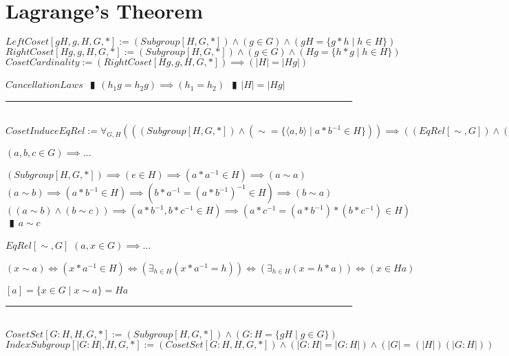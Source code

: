 \documentclass{book}
\newcommand{\abr}{:=}
\newcommand{\pipe}{$\phantom{(}\vrectangleblack\phantom{)}$}
\newcommand{\st}{\mathbin{|}}
\begin{document}
\section{Lagrange's Theorem}
$LeftCoset[g H, g, H, G, *] \abr (Subgroup[H, G, *]) \land (g \in G) \land (g H = \{g * h \st h \in H\})$ \\
$RightCoset[H g, g, H, G, *] \abr (Subgroup[H, G, *]) \land (g \in G) \land (H g = \{h * g \st h \in H\})$ \\

$CosetCardinality \abr (RightCoset[H g, g, H, G, *]) \implies (|H| = |H g|)$
\begin{enumerate}
  \lit $CancellationLaws$ \pipe $(h_1 g = h_2 g) \implies (h_1 = h_2)$ \pipe $|H| = |H g|$
\end{enumerate} \vspace{.75mm} \hrule \vspace{.75mm} \ \\ 

$CosetInduceEqRel \abr \forall_{G, H}(((Subgroup[H, G, *]) \land (\sim = \{\langle a, b \rangle \st a * b^{-1} \in H\})) \implies ((EqRel[\sim, G]) \land (EqClass[H a, a, \sim, G])))$
\begin{enumerate}
  \lit $(a, b, c \in G) \implies \ldots$
  \begin{enumerate}
    \lit $(Subgroup[H, G, *]) \implies (e \in H) \implies (a * a^{-1} \in H) \implies (a \sim a)$
    \lit $(a \sim b) \implies (a * b^{-1} \in H) \implies (b * a^{-1} = (a * b^{-1})^{-1} \in H) \implies (b \sim a)$
    \lit $((a \sim b) \land (b \sim c)) \implies (a * b^{-1}, b * c^{-1} \in H) \implies (a * c^{-1} = (a * b^{-1}) * (b * c^{-1}) \in H)$ \pipe $a \sim c$
  \end{enumerate}
  \lit $EqRel[\sim, G]$
  \lit $(a, x \in G) \implies \ldots$
  \begin{enumerate}
    \lit $(x \sim a) \iff (x * a^{-1} \in H) \iff (\exists_{h \in H}(x * a^{-1} = h)) \iff (\exists_{h \in H}(x = h * a)) \iff (x \in H a)$
  \end{enumerate}
  \lit $[a] = \{x \in G \st x \sim a\} = H a$
\end{enumerate} \vspace{.75mm} \hrule \vspace{.75mm} \ \\ 

$CosetSet[G : H, H, G, *] \abr (Subgroup[H, G, *]) \land (G : H = \{g H \st g \in G\})$ \\ %
$IndexSubgroup[|G : H|, H, G, *] \abr (CosetSet[G : H, H, G, *]) \land (|G : H| = |G : H|) \land (|G| = (|H|) (|G : H|))$ \\
\end{document}
